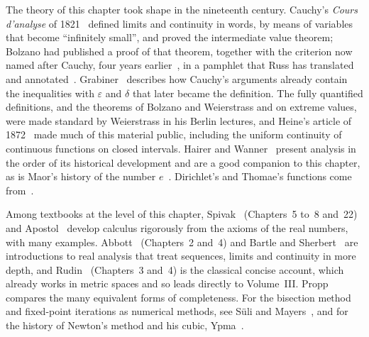 \chapternotes

The theory of this chapter took shape in the nineteenth century. Cauchy's \emph{Cours d'analyse} of 1821~\cite{cauchy1821} defined limits and continuity in words, by means of variables that become ``infinitely small'', and proved the intermediate value theorem; Bolzano had published a proof of that theorem, together with the criterion now named after Cauchy, four years earlier~\cite{bolzano1817}, in a pamphlet that Russ has translated and annotated~\cite{russ1980}. Grabiner~\cite{grabiner1981} describes how Cauchy's arguments already contain the inequalities with $\varepsilon$ and $\delta$ that later became the definition. The fully quantified definitions, and the theorems of Bolzano and Weierstrass and on extreme values, were made standard by Weierstrass in his Berlin lectures, and Heine's article of 1872~\cite{heine1872} made much of this material public, including the uniform continuity of continuous functions on closed intervals. Hairer and Wanner~\cite{hairer1996analysis} present analysis in the order of its historical development and are a good companion to this chapter, as is Maor's history of the number $e$~\cite{maor1994}. Dirichlet's and Thomae's functions come from~\cite{dirichlet1829,thomae1875}.

Among textbooks at the level of this chapter, Spivak~\cite{spivak2008calculus} (Chapters~5 to~8 and~22) and Apostol~\cite{apostol1967calculus} develop calculus rigorously from the axioms of the real numbers, with many examples. Abbott~\cite{abbott2015} (Chapters~2 and~4) and Bartle and Sherbert~\cite{bartle2011} are introductions to real analysis that treat sequences, limits and continuity in more depth, and Rudin~\cite{rudin1976} (Chapters~3 and~4) is the classical concise account, which already works in metric spaces and so leads directly to Volume~III. Propp~\cite{propp2013} compares the many equivalent forms of completeness. For the bisection method and fixed-point iterations as numerical methods, see S\"uli and Mayers~\cite{suli2003}, and for the history of Newton's method and his cubic, Ypma~\cite{ypma1995}.

\chapterreferences
